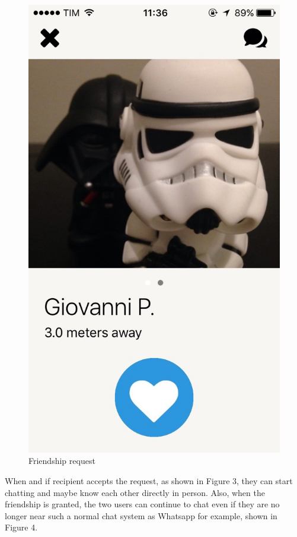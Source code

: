 \begin{multicols}{2}
\begin{figure}[H]
\centering
\includegraphics[scale=0.15]{./images/friendship_req.jpg}
\caption{\label{Friendship request}Friendship request}
\end{figure}
\end{multicols}

When and if recipient accepts the request, as shown in Figure 3, they can start chatting and maybe know each other directly in person. Also, when the friendship is granted, the two users can continue to chat even if they are no longer near such a normal chat system as Whatsapp for example, shown in Figure 4.

